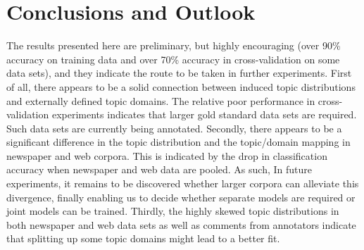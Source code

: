 \documentclass[11pt]{article}
\begin{document}
\section{Conclusions and Outlook}

The results presented here are preliminary, but highly encouraging (over 90\% accuracy on training data and over 70\% accuracy in cross-validation on some data sets), and they indicate the route to be taken in further experiments.
First of all, there appears to be a solid connection between induced topic distributions and externally defined topic domains.
The relative poor performance in cross-validation experiments indicates that larger gold standard data sets are required.
Such data sets are currently being annotated.
Secondly, there appears to be a significant difference in the topic distribution and the topic\slash domain mapping in newspaper and web corpora.
This is indicated by the drop in classification accuracy when newspaper and web data are pooled.
As such, 
In future experiments, it remains to be discovered whether larger corpora can alleviate this divergence, finally enabling us to decide whether separate models are required or joint models can be trained.
Thirdly, the highly skewed topic distributions in both newspaper and web data sets as well as comments from annotators indicate that splitting up some topic domains might lead to a better fit.



\end{document}
